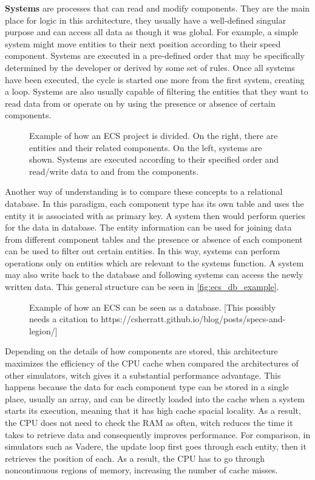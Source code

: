 \documentclass[twoside, 11pt]{article}
\begin{document}
\textbf{Systems} are processes that can read and modify components. They are the main place for logic in this architecture, they usually have a well-defined singular purpose and can access all data as though it was global. For example, a simple system might move entities to their next position according to their speed component. Systems are executed in a pre-defined order that may be specifically determined by the developer or derived by some set of rules. Once all systems have been executed, the cycle is started one more from the first system, creating a loop. Systems are also usually capable of filtering the entities that they want to read data from or operate on by using the presence or absence of certain components.

\begin{figure}
  \centering
  
  \caption{Example of how an ECS project is divided. On the right, there are entities and their related components. On the left, systems are shown. Systems are executed according to their specified order and read/write data to and from the components.}
  \label{fig:ecs_basic_example}
\end{figure}

Another way of understanding is to compare these concepts to a relational database. In this paradigm, each component type has its own table and uses the entity it is associated with as primary key. A system then would perform queries for the data in database. The entity information can be used for joining data from different component tables and the presence or absence of each component can be used to filter out certain entities. In this way, systems can perform operations only on entities which are relevant to the systems function. A system may also write back to the database and following systems can access the newly written data. This general structure can be seen in \autoref{fig:ecs_db_example}.

\begin{figure}
  \centering
  
  \caption{Example of how an ECS can be seen as a database. [This possibly needs a citation to https://csherratt.github.io/blog/posts/specs-and-legion/]}
  \label{fig:ecs_db_example}
\end{figure}

Depending on the details of how components are stored, this architecture maximizes the efficiency of the CPU cache when compared the architectures of other simulators, witch gives it a substantial performance advantage. This happens because the data for each component type can be stored in a single place, usually an array, and can be directly loaded into the cache when a system starts its execution, meaning that it has high cache spacial locality. As a result, the CPU does not need to check the RAM as often, witch reduces the time it takes to retrieve data and consequently improves performance. For comparison, in simulators such as Vadere, the update loop first goes through each entity, then it retrieves the position of each. As a result, the CPU has to go through noncontinuous regions of memory, increasing the number of cache misses.
\end{document}
